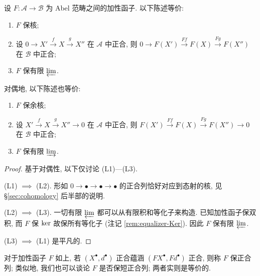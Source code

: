 \begin{proposition}\label{prop:left-right-exact-functor}
	设 $F: \mathcal{A} \to \mathcal{B}$ 为 Abel 范畴之间的加性函子. 以下陈述等价:
	\begin{enumerate}[(L1)]
		\item $F$ 保核;
		\item 设 $0 \to X' \xrightarrow{f} X \xrightarrow{g} X''$ 在 $\mathcal{A}$ 中正合, 则 $0 \to F(X') \xrightarrow{Ff} F(X) \xrightarrow{Fg} F(X'')$ 在 $\mathcal{B}$ 中正合;
		\item $F$ 保有限 $\varprojlim$.
	\end{enumerate}
	对偶地, 以下陈述也等价:
	\begin{enumerate}[(R1)]
		\item $F$ 保余核;
		\item 设 $X' \xrightarrow{f} X \xrightarrow{g} X'' \to 0$ 在 $\mathcal{A}$ 中正合, 则 $F(X') \xrightarrow{Ff} F(X) \xrightarrow{Fg} F(X'') \to 0$ 在 $\mathcal{B}$ 中正合;
		\item $F$ 保有限 $\varinjlim$.
	\end{enumerate}
\end{proposition}
\begin{proof}
	基于对偶性, 以下仅讨论 (L1)---(L3).
	
	(L1) $\implies$ (L2). 形如 $0 \to \bullet \to \bullet \to \bullet$ 的正合列恰好对应到态射的核, 见 \S\ref{sec:cohomology} 后半部的说明.

	(L2) $\implies$ (L3). 一切有限 $\varprojlim$ 都可以从有限积和等化子来构造. 已知加性函子保双积, 而 $F$ 保 $\operatorname{ker}$ 故保所有等化子 (注记 \ref{rem:equalizer-Ker}). 因此 $F$ 保有限 $\varprojlim$.
	
	(L3) $\implies$ (L1) 是平凡的.
\end{proof}

对于加性函子 $F$ 如上, 若 $(X^\bullet, d^\bullet)$ 正合蕴涵 $(FX^\bullet, Fd^\bullet)$ 正合, 则称 $F$ 保正合列; 类似地, 我们也可以谈论 $F$ 是否保短正合列; 两者实则是等价的.

